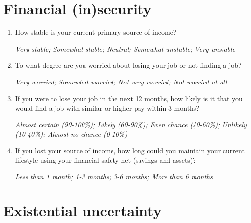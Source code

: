 \documentclass[11pt, headsepline]{article}
\begin{document}
\section*{Financial (in)security}

\begin{enumerate}[resume]

    \item How stable is your current primary source of income?

    \textit{Very stable; Somewhat stable; Neutral; Somewhat unstable; Very unstable}

    \item To what degree are you worried about losing your job or not finding a job?

    \textit{Very worried; Somewhat worried; Not very worried; Not worried at all}

    \item If you were to lose your job in the next 12 months, how likely is it that you would find a job with similar or higher pay within 3 months?

    \textit{Almost certain (90-100\%); Likely (60-90\%); Even chance (40-60\%); Unlikely (10-40\%); Almost no chance (0-10\%)}

    \item If you lost your source of income, how long could you maintain your current lifestyle using your financial safety net (savings and assets)?

    \textit{Less than 1 month; 1-3 months; 3-6 months; More than 6 months}



\end{enumerate}

\section*{Existential uncertainty}
\end{document}
